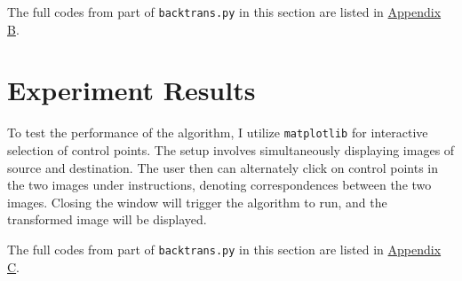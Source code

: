 \documentclass[UTF8]{ctexart}
\begin{document}
The full codes from part of \texttt{backtrans.py} in this section are listed in \hyperlink{code2}{Appendix B}.

\section{Experiment Results}
To test the performance of the algorithm, I utilize \texttt{matplotlib} for interactive selection of control points.
The setup involves simultaneously displaying images of source and destination.
The user then can alternately click on control points in the two images under instructions, denoting correspondences between the two images.
Closing the window will trigger the algorithm to run, and the transformed image will be displayed.

The full codes from part of \texttt{backtrans.py} in this section are listed in \hyperlink{code3}{Appendix C}.\\
\end{document}
